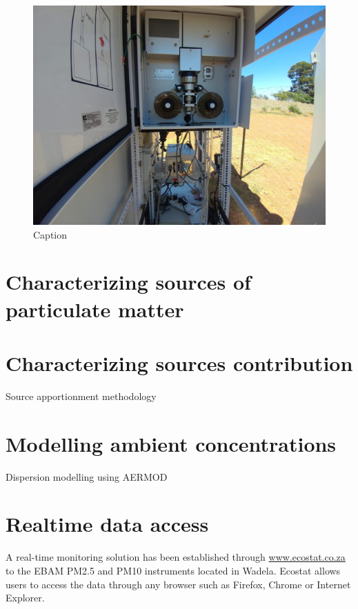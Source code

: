 \documentclass{nwureport}
\begin{document}
\begin{figure}[!htb]
    \centering
    \includegraphics[width=\textwidth]{images/wedela_6.jpeg}
    \caption[]{Caption}
    \label{fig:wadela_instruments_pm2}
\end{figure}

\section{Characterizing sources of particulate matter}

\section{Characterizing sources contribution}

Source apportionment methodology

\section{Modelling ambient concentrations}

Dispersion modelling using AERMOD

\section{Realtime data access}

A real-time monitoring solution has been established through \url{www.ecostat.co.za} to
the EBAM PM2.5 and PM10 instruments located in Wadela. Ecostat allows users to access the data
through any browser such as Firefox, Chrome or Internet Explorer. 
\end{document}
